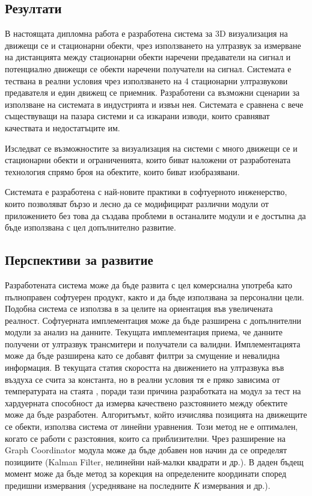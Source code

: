 \subsection{Резултати}

В настоящата дипломна работа е разработена система за 3D визуализация на движещи се и стационарни обекти, чрез използването на ултразвук за измерване на дистанцията между стационарни обекти наречени предаватели на сигнал и потенциално движещи се обекти наречени получатели на сигнал. Системата е тествана в реални условия чрез използването на 4 стационарни ултразвукови предавателя и един движещ се приемник. Разработени са възможни сценарии за използване на системата в индустрията и извън нея. Системата е сравнена с вече съществуващи на пазара системи и са изкарани изводи, които сравняват качествата и недостатъците им.

Изследват се възможностите за визуализация на системи с много движещи се и стационарни обекти и ограниченията, които биват наложени от разработената технология спрямо броя на обектите, които биват изобразявани.

Системата е разработена с най-новите практики в софтуерното инженерство, които позволяват бързо и лесно да се модифицират различни модули от приложението без това да създава проблеми в останалите модули и е достъпна да бъде използвана с цел допълнително развитие.

\subsection{Перспективи за развитие}
Разработената система може да бъде развита с цел комерсиална употреба като пълноправен софтуерен продукт, както и да бъде използвана за персонални цели. Подобна система се използва в \cite{vr} за целите на ориентация във увеличената реалност. Софтуерната имплементация може да бъде разширена с допълнителни модули за анализ на данните. Текущата имплементация приема, че данните получени от ултразвук трансмитери и получатели са валидни. Имплементацията може да бъде разширена като се добавят филтри за смущение и невалидна информация. В текущата статия скоростта на движението на ултразвука във въздуха се счита за константа, но в реални условия тя е пряко зависима от температурата на стаята \cite{vr}, поради тази причина разработката на модул за тест на хардуерната способност да измерва качествено разстоянието между обектите може да бъде разработен. Алгоритъмът, който изчислява позицията на движещите се обекти, използва система от линейни уравнения. Този метод не е оптимален, когато се работи с разстояния, които са приблизителни. Чрез разширение на Graph Coordinator модула може да бъде добавен нов начин да се определят позициите (Kalman Filter, нелинейни най-малки квадрати и др.). В даден бъдещ момент може да бъде метод за корекция на определените координати според предишни измервания (усредняване на последните \textit{К} измервания и др.).

